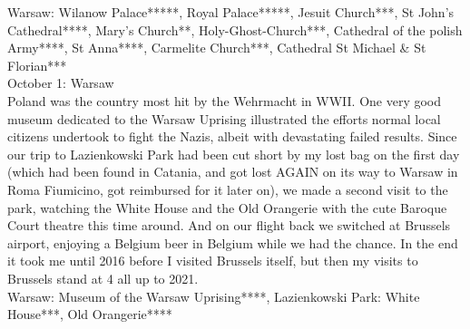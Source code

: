 Warsaw: Wilanow Palace*****, Royal Palace*****, Jesuit Church***, St John's Cathedral****, Mary's Church**, Holy-Ghost-Church***, Cathedral of the polish Army****, St Anna****, Carmelite Church***, Cathedral St Michael \& St Florian***\\

October 1: Warsaw\\
Poland was the country most hit by the Wehrmacht in WWII. One very good museum dedicated to the Warsaw Uprising illustrated the efforts normal local citizens undertook to fight the Nazis, albeit with devastating failed results. Since our trip to Lazienkowski Park had been cut short by my lost bag on the first day (which had been found in Catania, and got lost AGAIN on its way to Warsaw in Roma Fiumicino, got reimbursed for it later on), we made a second visit to the park, watching the White House and the Old Orangerie with the cute Baroque Court theatre this time around. And on our flight back we switched at Brussels airport, enjoying a Belgium beer in Belgium while we had the chance. In the end it took me until 2016 before I visited Brussels itself, but then my visits to Brussels stand at 4 all up to 2021.\\

Warsaw: Museum of the Warsaw Uprising****, Lazienkowski Park: White House***, Old Orangerie****
